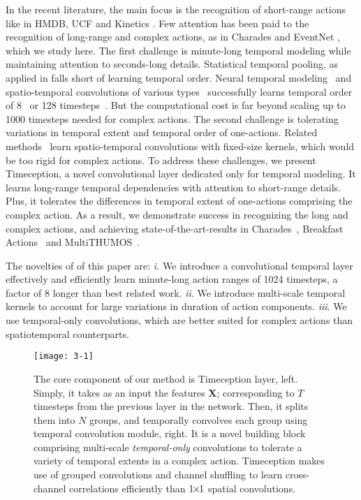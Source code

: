 \documentclass[10pt,twocolumn,letterpaper]{article}
\begin{document}
In the recent literature, the main focus is the recognition of short-range actions like in HMDB, UCF and Kinetics \cite{kuehne2011hmdb,soomro2012ucf101,kay2017kinetics}. Few attention has been paid to the recognition of long-range and complex actions, as in Charades and EventNet \cite{sigurdsson2016hollywood,ye2015eventnet}, which we study here. The first challenge is minute-long temporal modeling while maintaining attention to seconds-long details. Statistical temporal pooling, as applied in  \cite{girdhar2017attentional,miech2017learnable} falls short of learning temporal order. Neural temporal modeling~\cite{donahue2015long,girdhar2017actionvlad} and spatio-temporal convolutions of various types~\cite{ji20133d,tran2015learning, tran2018closer} successfully learns temporal order of 8~\cite{carreira2017quo} or 128 timesteps~\cite{wang2017non}. But the computational cost is far beyond scaling up to 1000 timesteps needed for complex actions. The second challenge is tolerating variations in temporal extent and temporal order of one-actions. Related methods~\cite{tran2015learning,xie2017rethinking} learn spatio-temporal convolutions with fixed-size kernels, which would be too rigid for complex actions. To address these challenges, we present Timeception, a novel convolutional layer dedicated only for temporal modeling. It learns long-range temporal dependencies with attention to short-range details. Plus, it tolerates the differences in temporal extent of one-actions comprising the complex action. As a result, we demonstrate success in recognizing the long and complex actions, and achieving state-of-the-art-results in Charades~\cite{sigurdsson2016hollywood}, Breakfast Actions~\cite{kuehne2014language} and MultiTHUMOS~\cite{yeung2018every}.

The novelties of of this paper are:
\textit{i.} We introduce a convolutional temporal layer effectively and efficiently learn minute-long action ranges of 1024 timesteps, a factor of 8 longer than best related work.
\textit{ii}. We introduce multi-scale temporal kernels to account for large variations in duration of action components.
\textit{iii}. We use temporal-only convolutions, which are better suited for complex actions than spatiotemporal counterparts.

\begin{figure*}[!ht]
\begin{center}
\texttt{[image: 3-1]}
\end{center}
\caption{The core component of our method is Timeception layer, left.
Simply, it takes as an input the features $\mathbf{X}$; corresponding to $T$ timesteps from the previous layer in the network.
Then, it splits them into $N$ groups, and temporally convolves each group using temporal convolution module, right.
It is a novel building block comprising multi-scale \textit{temporal-only} convolutions to tolerate a variety of temporal extents in a complex action.
Timeception makes use of grouped convolutions and channel shuffling to learn cross-channel correlations efficiently than $1 {\mkern-2mu\times\mkern-2mu} 1$ spatial convolutions.}
\label{fig:3-1}
\vspace*{-5mm}
\end{figure*}
\end{document}

